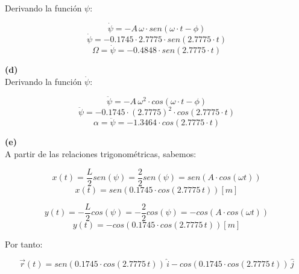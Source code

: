 \documentclass[letter,11pt]{article}
\begin{document}
Derivando la función $\psi$:

\begin{equation*}
    \dot{\psi} = - A\, \omega \cdot sen(\omega \cdot t - \phi)
\end{equation*}
\begin{equation*}
    \dot{\psi} = - 0.1745 \cdot 2.7775 \cdot sen(2.7775 \cdot t)
\end{equation*}
\begin{equation}
    \Omega = \dot{\psi} = - 0.4848 \cdot sen(2.7775 \cdot t)
\end{equation}

\textbf{(d)} \\

Derivando la función $\dot{\psi}$:

\begin{equation*}
    \ddot{\psi} = - A\, \omega^2 \cdot cos(\omega \cdot t - \phi)
\end{equation*}
\begin{equation*}
    \ddot{\psi} = -0.1745 \cdot (2.7775)^2 \cdot cos(2.7775 \cdot t)
\end{equation*}
\begin{equation}
    \alpha = \ddot{\psi} = -1.3464 \cdot cos(2.7775 \cdot t)
\end{equation}

\textbf{(e)} \\

A partir de las relaciones trigonométricas, sabemos:

\begin{equation*}
    x(t) = \frac{L}{2} sen (\psi) = \frac{2}{2} sen (\psi) = sen(A \cdot cos(\omega t))
\end{equation*}
\begin{equation}
    x(t) = sen ( 0.1745 \cdot cos (2.7775\, t) ) [m]
\end{equation}

\begin{equation*}
    y(t) = -\frac{L}{2} cos (\psi) = - \frac{2}{2} cos(\psi) = - cos(A \cdot cos(\omega t))
\end{equation*}
\begin{equation}
    y(t) = - cos ( 0.1745 \cdot cos (2.7775\, t) ) [m]
\end{equation}

Por tanto:

\begin{equation}
    \vec{r}(t) = sen(0.1745 \cdot cos(2.7775\, t))\, \hat{i} - cos(0.1745 \cdot cos(2.7775\, t))\, \hat{j}
\end{equation}
\end{document}
